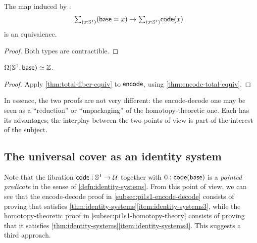 \begin{cor}\label{thm:encode-total-equiv}
  The map induced by \encode:
  \[ \tsm{x:\Sn^1} (\base=x) \to \tsm{x:\Sn^1}\code(x) \]
  is an equivalence.
\end{cor}
\begin{proof}
  Both types are contractible.
\end{proof}

\begin{thm}
  $\Omega(\mathbb{S}^1,\mathsf{base}) \simeq \mathbb{Z}$.
\end{thm}
\begin{proof}
  Apply \cref{thm:total-fiber-equiv} to $\mathsf{encode}$, using \cref{thm:encode-total-equiv}.
\end{proof}

In essence, the two proofs are not very different: the encode-decode one may be seen as a ``reduction'' or ``unpackaging'' of the homotopy-theoretic one.
Each has its advantages; the interplay between the two points of view is part of the interest of the subject.


\subsection{The universal cover as an identity system}
\label{sec:pi1s1-idsys}

Note that the fibration $\mathsf{code}:\mathbb{S}^1\to\mathcal{U}$ together with $0:\mathsf{code}(\mathsf{base})$ is a \emph{pointed predicate} in the sense of \cref{defn:identity-systems}.
From this point of view, we can see that the encode-decode proof in \cref{subsec:pi1s1-encode-decode} consists of proving that \code satisfies \cref{thm:identity-systems}\ref{item:identity-systems3}, while the homotopy-theoretic proof in \cref{subsec:pi1s1-homotopy-theory} consists of proving that it satisfies \cref{thm:identity-systems}\ref{item:identity-systems4}.
This suggests a third approach.

